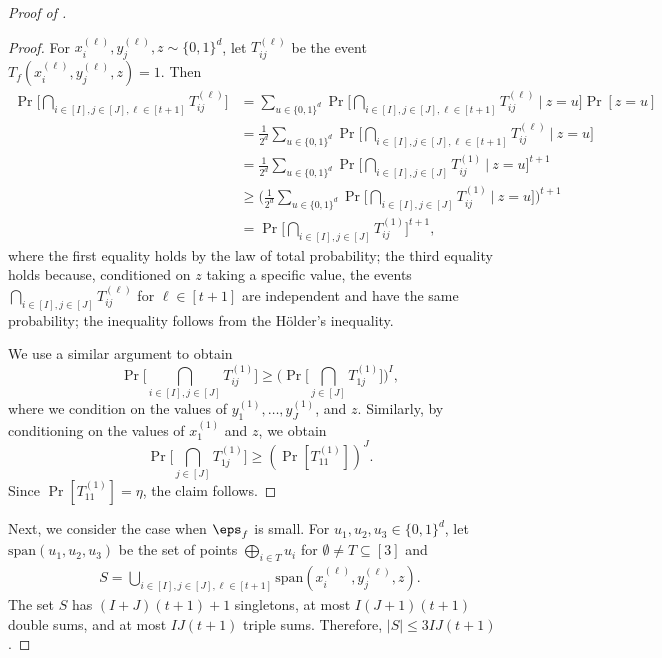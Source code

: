 \documentclass{toc}
\begin{document}
\begin{proof}[Proof of ]
\begin{proof}
    
    For $x_i^{(\ell)}, y_j^{(\ell)}, z \sim \{0,1\}^d$, let $T_{ij}^{(\ell)}$ be the event $T_f(x_i^{(\ell)}, y_j^{(\ell)}, z) = 1$. Then
    \begin{align*}
          \Pr\Big[ \bigcap_{i \in [I], j \in [J],  \ell \in [t+1]} T_{ij}^{(\ell)}\Big] &= \sum_{u \in \{0,1\}^d}     \Pr\Big[  \bigcap_{i \in [I], j \in [J],  \ell \in [t+1]} T_{ij}^{(\ell)} \:|\:  z = u\Big]\Pr[ z = u] \\
          &= \frac{1}{2^{d}}\sum_{u \in \{0,1\}^d}     \Pr\Big[  \bigcap_{i \in [I], j \in [J],  \ell \in [t+1]} T_{ij}^{(\ell)} \:|\: z=u\Big] \\
          &= \frac{1}{2^{d}}\sum_{u \in \{0,1\}^d}     \Pr\Big[ \bigcap_{i \in [I], j \in [J]} T_{ij}^{(1)} \:|\:z = u\Big]^{t+1} \\
          &\geq \Big( \frac{1}{2^{d}} \sum_{u \in \{0,1\}^d}     \Pr\Big[ \bigcap_{i \in [I], j \in [J]} T_{ij}^{(1)} \:|\:z = u\Big] \Big)^{t+1} \\
          &= \Pr\biggl[ \bigcap_{ i \in [I], j \in [J]} T_{ij}^{(1)}\biggr]^{t+1},
    \end{align*}
    where the first equality holds by the law of total probability; the third equality holds because, conditioned on $z$ taking a specific value,  the events $\bigcap_{i \in [I],j\in[J]}T_{ij}^{(\ell)}$ for $\ell\in[t+1]$ are independent and have the same probability; the inequality follows from the H\"{o}lder's inequality. 
    
    We use a similar argument to obtain
    \begin{equation*}
        \Pr\Big[ \bigcap_{ i \in [I], j \in [J]} T_{ij}^{(1)}\Big] \geq \Big(\Pr\Big[ \bigcap_{ j \in [J]} T_{1j}^{(1)}\Big]\Big)^{I},
    \end{equation*}
    where we condition on the values of $y_1^{(1)}, \dots, y_J^{(1)}$, and $z$. Similarly, by conditioning on the values of $x_1^{(1)}$ and $z$, we obtain
     \begin{equation*}
        \Pr\Big[ \bigcap_{ j \in [J]} T_{1j}^{(1)}\Big] \geq (\Pr[T_{11}^{(1)}])^{J}.
    \end{equation*}
    Since $\Pr[T_{11}^{(1)}] = \eta$, the claim follows. 
\end{proof}


Next, we consider the case when $\eps_f$ is small. For $u_1, u_2, u_3 \in \{0,1\}^d$, let $\mathrm{span}(u_1, u_2, u_3)$ be the set of points $\bigoplus_{i \in T} u_i$ for $ \emptyset \neq T \subseteq [3]$ and 
 \begin{align*}
      S = \bigcup_{i \in [I], j\in [J], \ell \in [t+1]} \mathrm{span}(x_i^{(\ell)}, y_j^{(\ell)}, z) .
 \end{align*}
 The set $S$ has $(I+J)(t+1)+1$ singletons, at most $I(J+1)(t+1)$ double sums, and at most $IJ(t+1)$ triple sums. Therefore, $|S| \leq 3IJ(t+1)$.  
 

\end{proof}
\end{document}
